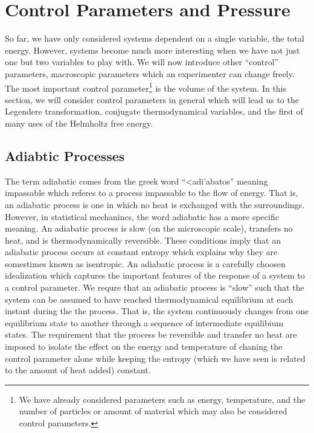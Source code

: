 \documentclass[11pt,a4paper]{article}
\theoremstyle{theorem}
\theoremstyle{definition}
\theoremstyle{definition}
\theoremstyle{remark}
\theoremstyle{definition}
\theoremstyle{remark}
\begin{document}
\section{Control Parameters and Pressure}

So far, we have only considered systems dependent on a single variable, the total energy.  However, systems become much more interesting when we have not just one but two variables to play with. We will now introduce other ``control'' parameters, macroscopic parameters which an experimenter can change freely. The most important control parameter\footnote{We have already considered parameters such as energy, temperature, and the number of particles or amount of material which may also be considered control parameters.} is the volume of the system. In this section, we will consider control parameters in general which will lead us to the Legendere transformation, conjugate thermodynamical variables, and the first of many uses of the Helmholtz free energy. 

\subsection{Adiabtic Processes}

The term adiabatic comes from the greek word ``\textgreek{<adi'abatos}'' meaning impassable which referes to a process impassable to the flow of energy. That is, an adiabatic process is one in which no heat is exchanged with the surroundings. However, in statistical mechanincs, the word adiabatic has a more specific meaning. An adiabatic process is slow (on the microscopic scale), transfers no heat, and is thermodynamically reversible. These conditions imply that an adiabatic process occurs at constant entropy which explains why they are somestimes known as isentropic. An adiabatic process is a carefully choosen idealization which captures the important features of the response of a system to a control parameter. We requre that an adiabatic process is ``slow'' such that the system can be assumed to have reached thermodynamical equilibrium at each instant during the the process. That is, the system continuously changes from one equilibrium state to another through a sequence of intermediate equilibium states. The requirement that the process be reversible and transfer no heat are imposed to isolate the effect on the energy and temperature of chaning the control parameter alone while keeping the entropy (which we have seen is related to the amount of heat added) constant. 
 
\end{document}
